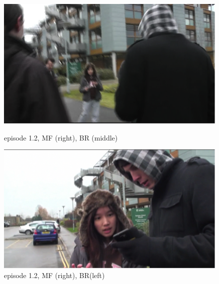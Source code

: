 \begin{figure}[ht]
\centering
\begin{minipage}[b]{0.45\linewidth}
\includegraphics[width=1\textwidth]{img/study1/ep2/ep21}
\caption{episode 1.2, MF (right), BR (middle)}
\label{fig:study2ep21}
\end{minipage}
\quad
\begin{minipage}[b]{0.45\linewidth}
 \includegraphics[width=1\textwidth]{img/study1/ep2/ep22}
\caption{episode 1.2, MF (right), BR(left)}
\label{fig:study2ep22}
\end{minipage}
\end{figure}

